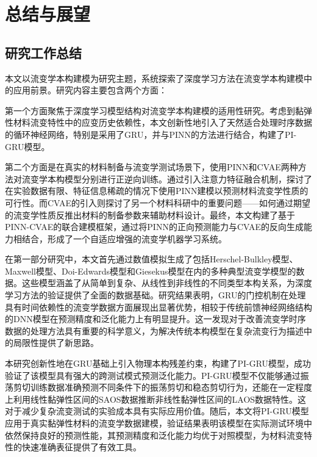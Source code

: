 \chapter{总结与展望}

\section*{研究工作总结}
本文以流变学本构建模为研究主题，系统探索了深度学习方法在流变学本构建模中的应用前景。研究内容主要包含两个方面：

第一个方面聚焦于深度学习模型结构对流变学本构建模的适用性研究。考虑到黏弹性材料流变特性中的应变历史依赖性，本文创新性地引入了天然适合处理时序数据的循环神经网络，特别是采用了GRU，并与PINN的方法进行结合，构建了PI-GRU模型。

第二个方面是在真实的材料制备与流变学测试场景下，使用PINN和CVAE两种方法对流变学本构模型分别进行正逆向训练。通过引入注意力特征融合机制，探讨了在实验数据有限、特征信息稀疏的情况下使用PINN建模以预测材料流变学性质的可行性。而CVAE的引入则探讨了另一个材料科研中的重要问题——如何通过期望的流变学性质反推出材料的制备参数来辅助材料设计。最终，本文构建了基于PINN-CVAE的联合建模框架，通过将PINN的正向预测能力与CVAE的反向生成能力相结合，形成了一个自适应增强的流变学机器学习系统。

在第一部分研究中，本文首先通过数值模拟生成了包括Herschel-Bulkley模型、Maxwell模型、Doi-Edwards模型和Giesekus模型在内的多种典型流变学模型的数据。这些模型涵盖了从简单到复杂、从线性到非线性的不同类型本构关系，为深度学习方法的验证提供了全面的数据基础。研究结果表明，GRU的门控机制在处理具有时间依赖性的流变学数据方面展现出显著优势，相较于传统前馈神经网络结构的DNN模型在预测精度和泛化能力上有明显提升。这一发现对于改善流变学时序数据的处理方法具有重要的科学意义，为解决传统本构模型在复杂流变行为描述中的局限性提供了新思路。

本研究创新性地在GRU基础上引入物理本构残差约束，构建了PI-GRU模型，成功验证了该模型具有强大的跨测试模式预测泛化能力。PI-GRU模型不仅能够通过振荡剪切训练数据准确预测不同条件下的振荡剪切和稳态剪切行为，还能在一定程度上利用线性黏弹性区间的SAOS数据推断非线性黏弹性区间的LAOS数据特性。这对于减少复杂流变测试的实验成本具有实际应用价值。随后，本文将PI-GRU模型应用于真实黏弹性材料的流变学数据建模，验证结果表明该模型在实际测试环境中依然保持良好的预测性能，其预测精度和泛化能力均优于对照模型，为材料流变特性的快速准确表征提供了有效工具。

